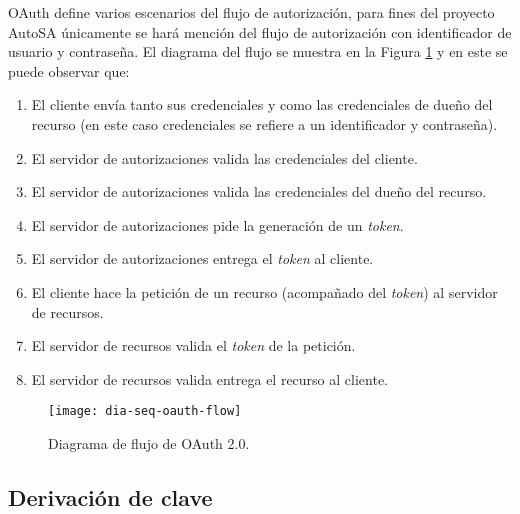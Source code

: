 OAuth define varios escenarios del flujo de autorización, para fines del proyecto AutoSA únicamente se hará mención del flujo de autorización con identificador de usuario y contraseña\cite{OAuthRFC, OAuth2Identity}. El diagrama del flujo se muestra en la Figura \ref{fig:dia-seq-oauth-flow} y en este se puede observar que:
\begin{enumerate}
	\item El cliente envía tanto sus credenciales y como las credenciales de dueño del recurso (en este caso credenciales se refiere a un identificador y contraseña).
	\item El servidor de autorizaciones valida las credenciales del cliente.
	\item El servidor de autorizaciones valida las credenciales del dueño del recurso.
	\item El servidor de autorizaciones pide la generación de un \textit{token}.
	\item El servidor de autorizaciones entrega el \textit{token} al cliente.
	\item El cliente hace la petición de un recurso (acompañado del \textit{token}) al servidor de recursos.
	\item El servidor de recursos valida el \textit{token} de la petición. 
	\item El servidor de recursos valida entrega el recurso al cliente.
\end{enumerate}

\begin{figure}[h]
	\centering
	\texttt{[image: dia-seq-oauth-flow]}
	\caption{Diagrama de flujo de OAuth 2.0.}
	\label{fig:dia-seq-oauth-flow}
\end{figure}

\subsection{Derivación de clave}\label{sec:key-derivation}

